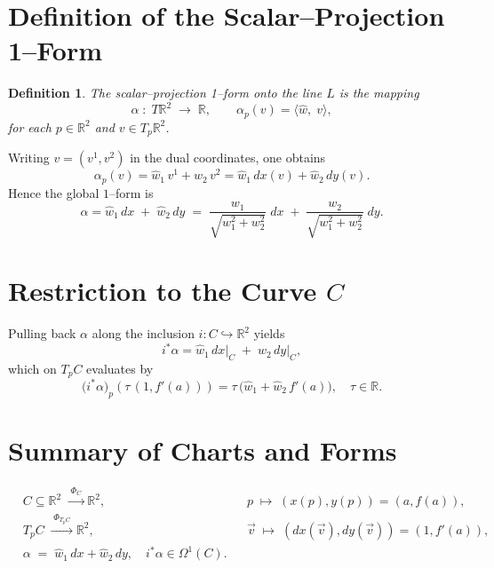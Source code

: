 \documentclass[12pt]{article}
\theoremstyle{definitionstyle}
\newtheorem{definition}{Definition} %
\newcommand{\R}{\mathbb{R}}
\begin{document}
\section{Definition of the Scalar–Projection 1–Form}
\begin{definition}
	The \emph{scalar–projection 1–form} onto the line \(L\) is the mapping
	\[
	\alpha\;\colon\;T\mathbb{R}^2
	\;\longrightarrow\;\mathbb{R},
	\qquad
	\alpha_p(v)
	=\bigl\langle \hat w,\;v\bigr\rangle,
	\]
	for each \(p\in\mathbb{R}^2\) and \(v\in T_p\mathbb{R}^2\).
\end{definition}

Writing \(v=(v^1,v^2)\) in the dual coordinates, one obtains
\[
\alpha_p(v)
=\hat w_1\,v^1 + \hat w_2\,v^2
=\hat w_1\,dx(v)+\hat w_2\,dy(v).
\]
Hence the global \(1\)–form is
\[
\boxed{
	\alpha
	=\hat w_1\,dx
	\;+\;
	\hat w_2\,dy
	\;=\;
	\frac{w_1}{\sqrt{w_1^2+w_2^2}}\;dx
	\;+\;
	\frac{w_2}{\sqrt{w_1^2+w_2^2}}\;dy.
}
\]

\section{Restriction to the Curve \(C\)}
Pulling back \(\alpha\) along the inclusion \(i\colon C\hookrightarrow\R^2\) yields
\[
i^*\alpha
=\hat w_1\,dx\bigl|_C
\;+\;\hat w_2\,dy\bigl|_C,
\]
which on \(T_pC\) evaluates by
\[
\bigl(i^*\alpha\bigr)_p(\tau\,(1,f'(a)))
=\tau\,\bigl(\hat w_1 + \hat w_2\,f'(a)\bigr),
\quad
\tau\in\mathbb{R}.
\]

\section*{Summary of Charts and Forms}
\[
\begin{aligned}
	&C\subseteq\mathbb{R}^2
	\;\xrightarrow{\;\Phi_C\;}
	\mathbb{R}^2,
	&&
	p\;\mapsto\;(x(p),y(p))
	=(a,f(a)),\\
	&T_pC
	\;\xrightarrow{\;\Phi_{T_pC}\;}
	\mathbb{R}^2,
	&&
	\vec v\;\mapsto\;(dx(\vec v),dy(\vec v))
	=(1,f'(a)),\\
	&\alpha\;=\;\hat w_1\,dx+\hat w_2\,dy,
	\quad
	i^*\alpha\in\Omega^1(C).
\end{aligned}
\]
	
\end{document}

